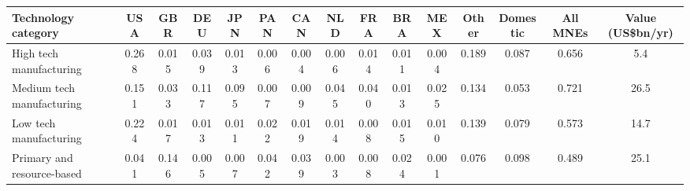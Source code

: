 \begin{tabular}{lcccccccccccccc}
\toprule
Technology category & USA & GBR & DEU & JPN & PAN & CAN & NLD & FRA & BRA & MEX & Other & Domestic & All MNEs & Value (US\$bn/yr) \\
\midrule
High tech manufacturing & 0.268 & 0.015 & 0.039 & 0.013 & 0.006 & 0.004 & 0.006 & 0.014 & 0.011 & 0.004 & 0.189 & 0.087 & 0.656 & 5.4 \\
Medium tech manufacturing & 0.151 & 0.033 & 0.117 & 0.095 & 0.007 & 0.009 & 0.045 & 0.040 & 0.013 & 0.025 & 0.134 & 0.053 & 0.721 & 26.5 \\
Low tech manufacturing & 0.224 & 0.017 & 0.013 & 0.011 & 0.022 & 0.019 & 0.014 & 0.008 & 0.015 & 0.010 & 0.139 & 0.079 & 0.573 & 14.7 \\
Primary and resource-based & 0.041 & 0.146 & 0.005 & 0.007 & 0.042 & 0.039 & 0.003 & 0.008 & 0.024 & 0.001 & 0.076 & 0.098 & 0.489 & 25.1 \\
\bottomrule
\end{tabular}
